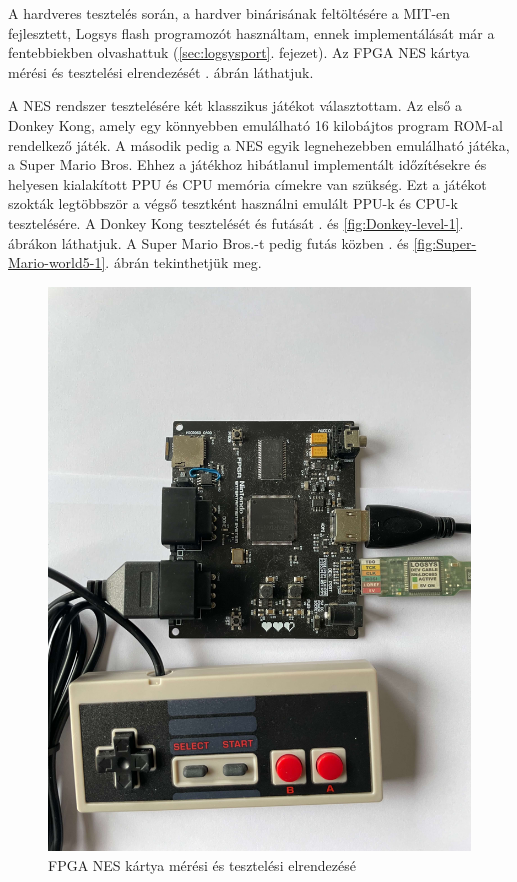 A hardveres tesztelés során, a hardver binárisának feltöltésére a MIT-en fejlesztett, Logsys flash programozót használtam, ennek implementálását már a fentebbiekben olvashattuk (\ref{sec:logsysport}. fejezet). Az FPGA NES kártya mérési és tesztelési elrendezését . ábrán láthatjuk. 

A NES rendszer tesztelésére két klasszikus játékot választottam. Az első a Donkey Kong, amely egy könnyebben emulálható 16 kilobájtos program ROM-al rendelkező játék. A második pedig a NES egyik legnehezebben emulálható játéka, a Super Mario Bros. Ehhez a játékhoz hibátlanul implementált időzítésekre és helyesen kialakított PPU és CPU memória címekre van szükség. Ezt a játékot szokták legtöbbször a végső tesztként használni emulált PPU-k és CPU-k tesztelésére. A Donkey Kong tesztelését és futását . és \ref{fig:Donkey-level-1}. ábrákon láthatjuk. A Super Mario Bros.-t pedig futás közben . és \ref{fig:Super-Mario-world5-1}. ábrán tekinthetjük meg.
	
\begin{figure}[H]
	\centering
	\includegraphics[width=112mm, keepaspectratio, angle=90]{figures/nes-pcb-testing}
	\caption{FPGA NES kártya mérési és tesztelési elrendezésé} 
	\label{fig:pcb-testing}
\end{figure}

